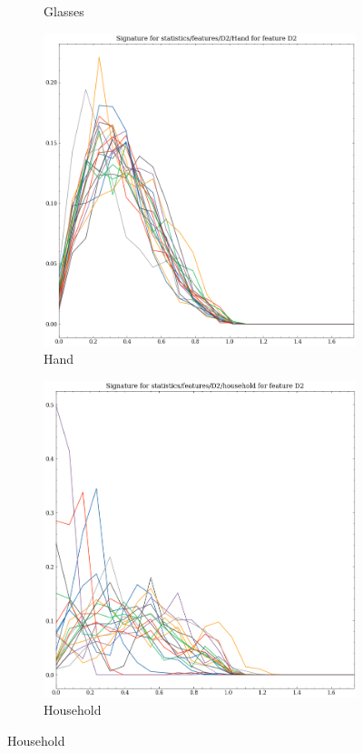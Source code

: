 \begin{figure}[t!p]
\begin{subfigure}[b]{0.23\textwidth}
        \caption{Glasses}
    \end{subfigure}
    \hfill
    \begin{subfigure}[b]{0.23\textwidth}
        \includegraphics[width=\textwidth]{assets/feature_extraction/D2/Hand.png}
        \caption{Hand}
    \end{subfigure}
    \hfill
    \begin{subfigure}[b]{0.23\textwidth}
        \includegraphics[width=\textwidth]{assets/feature_extraction/D2/household.png}
        \caption{Household}
    \end{subfigure}
    \hfill


\end{figure}
